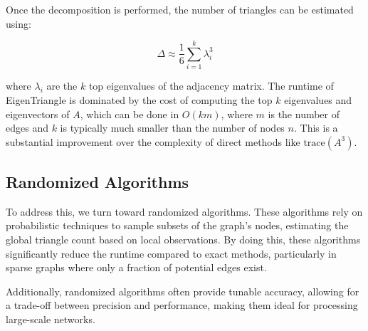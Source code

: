 \documentclass[12pt]{report}
\begin{document}
Once the decomposition is performed, the number of triangles can be estimated using:

\[
\Delta \approx \frac{1}{6} \sum_{i=1}^{k} \lambda_i^3
\]

where $\lambda_i$ are the $k$ top eigenvalues of the adjacency matrix.
The runtime of EigenTriangle is dominated by the cost of computing the top $k$ eigenvalues and eigenvectors of $A$, which can be done in $O(k m)$, where $m$ is the number of edges and $k$ is typically much smaller than the number of nodes $n$.
This is a substantial improvement over the complexity of direct methods like $\mathrm{trace}(A^3)$.

\subsection{Randomized Algorithms}

To address this, we turn toward randomized algorithms. These algorithms rely on probabilistic techniques to sample subsets of the graph's nodes, estimating the global triangle count based on local observations.
By doing this, these algorithms significantly reduce the runtime compared to exact methods, particularly in sparse graphs where only a fraction of potential edges exist.

Additionally, randomized algorithms often provide tunable accuracy, allowing for a trade-off between precision and performance, making them ideal for processing large-scale networks.

\newpage


\end{document}
